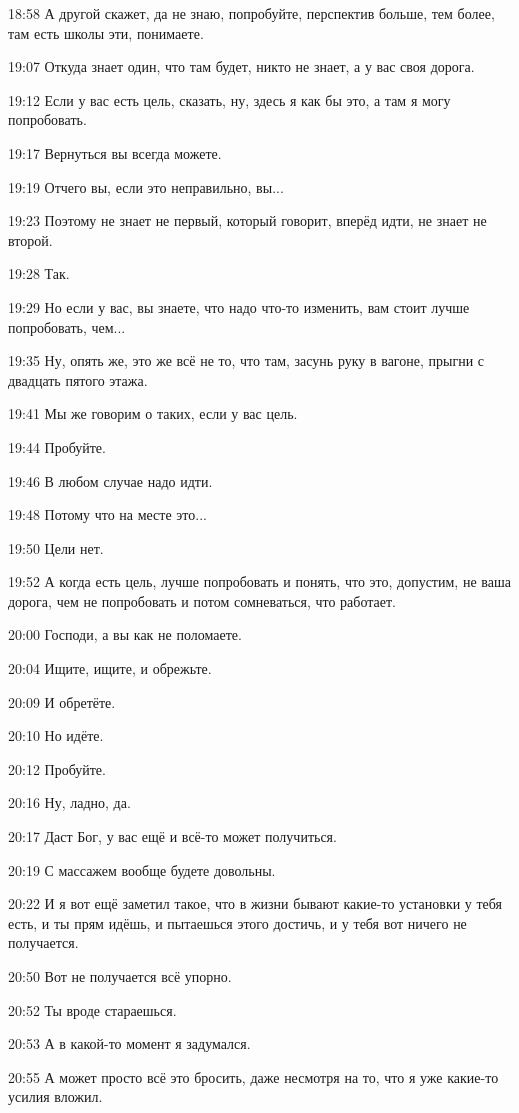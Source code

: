 18:58
А другой скажет, да не знаю, попробуйте, перспектив больше, тем более, там есть школы эти, понимаете.

19:07
Откуда знает один, что там будет, никто не знает, а у вас своя дорога.

19:12
Если у вас есть цель, сказать, ну, здесь я как бы это, а там я могу попробовать.

19:17
Вернуться вы всегда можете.

19:19
Отчего вы, если это неправильно, вы...

19:23
Поэтому не знает не первый, который говорит, вперёд идти, не знает не второй.

19:28
Так.

19:29
Но если у вас, вы знаете, что надо что-то изменить, вам стоит лучше попробовать, чем...

19:35
Ну, опять же, это же всё не то, что там, засунь руку в вагоне, прыгни с двадцать пятого этажа.

19:41
Мы же говорим о таких, если у вас цель.

19:44
Пробуйте.

19:46
В любом случае надо идти.

19:48
Потому что на месте это...

19:50
Цели нет.

19:52
А когда есть цель, лучше попробовать и понять, что это, допустим, не ваша дорога, чем не попробовать и потом сомневаться, что работает.

20:00
Господи, а вы как не поломаете.

20:04
Ищите, ищите, и обрежьте.

20:09
И обретёте.

20:10
Но идёте.

20:12
Пробуйте.

20:16
Ну, ладно, да.

20:17
Даст Бог, у вас ещё и всё-то может получиться.

20:19
С массажем вообще будете довольны.

20:22
И я вот ещё заметил такое, что в жизни бывают какие-то установки у тебя есть, и ты прям идёшь, и пытаешься этого достичь, и у тебя вот ничего не получается.

20:50
Вот не получается всё упорно.

20:52
Ты вроде стараешься.

20:53
А в какой-то момент я задумался.

20:55
А может просто всё это бросить, даже несмотря на то, что я уже какие-то усилия вложил.

